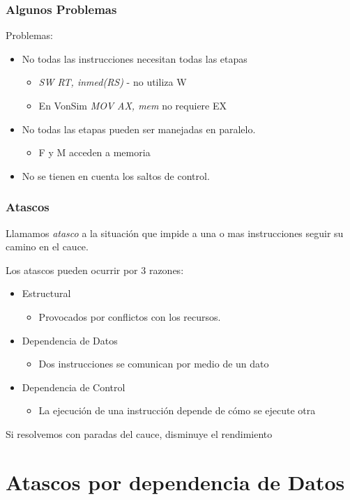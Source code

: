 \documentclass{beamer}
\begin{document}
\begin{frame}
\frametitle{Algunos Problemas}
Problemas:
\begin{itemize}
\item  No todas las instrucciones necesitan todas las etapas
\begin{itemize}
\item \emph{SW RT, inmed(RS)} -  no utiliza W
\item En VonSim \emph{MOV AX, mem} no requiere EX
\end{itemize}
 \item No todas las etapas pueden ser manejadas en paralelo.
\begin{itemize}
\item F y M acceden a memoria
\end{itemize}
\item No se tienen en cuenta los saltos de control.
\end{itemize}
\end{frame}


\begin{frame}
\frametitle{Atascos}
Llamamos \emph{atasco} a la situación que impide a una o mas instrucciones seguir su camino en el cauce.

Los atascos pueden ocurrir por 3 razones:

\begin{itemize}
\item Estructural
\begin{itemize}
\item Provocados por conflictos con los recursos.
\end{itemize}


\item Dependencia de Datos
\begin{itemize}
\item Dos instrucciones se comunican por medio de un dato
\end{itemize}

\item Dependencia de Control
\begin{itemize}
\item La ejecución de una instrucción depende de cómo se ejecute otra
\end{itemize}

\end{itemize}
Si resolvemos con paradas del cauce, disminuye el rendimiento
\end{frame}


\section{Atascos por dependencia de Datos}
\end{document}

